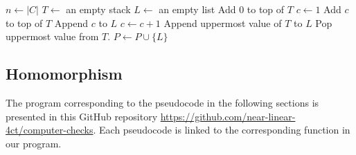\documentclass[main.tex]{subfiles}
\begin{document}
\begin{algorithm}[H]
    \caption{AllPlanarKempeChains($C$)}
    \label{alg:check-red_b}
    \begin{algorithmic}[1]
        \State $n \gets |C|$
            \State $T \gets$ an empty stack
            \State $L \gets$ an empty list
            \State Add $0$ to top of $T$
            \State $c \gets 1$
                    \State Add $c$ to top of $T$
                    \State Append $c$ to $L$
                    \State $c \gets c+1$
                \EndIf
                    \State Append uppermost value of $T$ to $L$
                    \State Pop uppermost value from $T$.
                \EndIf
            \EndFor
            \State $P \gets P \cup \{L\}$
        \EndFor
    \end{algorithmic}
\end{algorithm}

\subsection{Homomorphism}
\label{sect:code-hom}
The program corresponding to the pseudocode in the following sections is presented in this GitHub repository \url{https://github.com/near-linear-4ct/computer-checks}.
Each pseudocode is linked to the corresponding function in our \Cpp program.

\newcommand{\githubbase}{https://github.com/near-linear-4ct/computer-checks/blob/49eecf5b9b59e32e2b0ef6fedb9505e6714fcd7d}
\newcommand{\githublink}[3]{\href{\githubbase/#1\##2}{#3}} %
\end{document}
